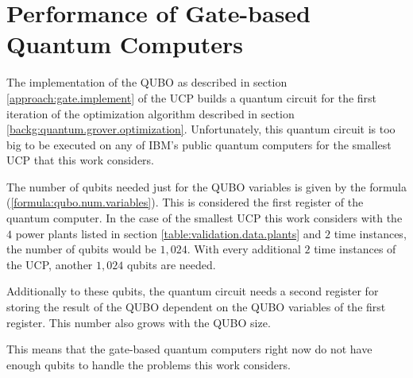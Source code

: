 \section{Performance of Gate-based Quantum Computers}

The implementation of the QUBO as described in section \ref{approach:gate.implement} of the UCP builds a quantum circuit for the first iteration of the optimization algorithm described in section \ref{backg:quantum.grover.optimization}.
Unfortunately, this quantum circuit is too big to be executed on any of IBM's public quantum computers for the smallest UCP that this work considers.

The number of qubits needed just for the QUBO variables is given by the formula (\ref{formula:qubo.num.variables}).
This is considered the first register of the quantum computer.
In the case of the smallest UCP this work considers with the $4$ power plants listed in section \ref{table:validation.data.plants} and $2$ time instances, the number of qubits would be $1, 024$.
With every additional $2$ time instances of the UCP, another $1, 024$ qubits are needed.

Additionally to these qubits, the quantum circuit needs a second register for storing the result of the QUBO dependent on the QUBO variables of the first register.
This number also grows with the QUBO size.

This means that the gate-based quantum computers right now do not have enough qubits to handle the problems this work considers.
